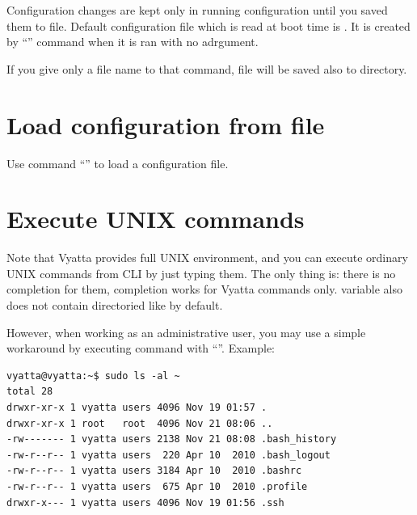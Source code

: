 \discussion
Configuration changes are kept only in running configuration until you saved them to file. Default configuration
file which is read at boot time is . It is created by 
``'' command when it is ran with no adrgument.

If you give only a file name to that command, file will be saved also to  
directory.

\section{Load configuration from file}
\solution
Use command ``'' to load a configuration file.

\section{Execute UNIX commands}
\solution
Note that Vyatta provides full UNIX environment, and you can execute ordinary UNIX commands from CLI by just typing
them. The only thing is: there is no completion for them, completion works for Vyatta commands only. 
 variable also does not contain directoried like  by default.

However, when working as an administrative user, you may use a simple workaround by executing command with
``''. Example:
\begin{verbatim}
vyatta@vyatta:~$ sudo ls -al ~
total 28
drwxr-xr-x 1 vyatta users 4096 Nov 19 01:57 .
drwxr-xr-x 1 root   root  4096 Nov 21 08:06 ..
-rw------- 1 vyatta users 2138 Nov 21 08:08 .bash_history
-rw-r--r-- 1 vyatta users  220 Apr 10  2010 .bash_logout
-rw-r--r-- 1 vyatta users 3184 Apr 10  2010 .bashrc
-rw-r--r-- 1 vyatta users  675 Apr 10  2010 .profile
drwxr-x--- 1 vyatta users 4096 Nov 19 01:56 .ssh
\end{verbatim}
